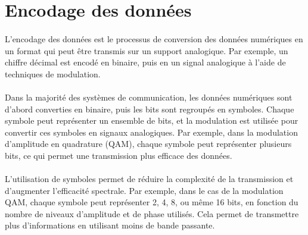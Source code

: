 \documentclass[a4paper,twocolumn]{report}
\begin{document}
\section{Encodage des données}

\paragraph{}L'encodage des données est le processus de conversion des données numériques
en un format qui peut être transmis sur un support analogique.
Par exemple, un chiffre décimal est encodé en binaire, puis en un signal
analogique à l'aide de techniques de modulation.
\paragraph{}Dans la majorité des systèmes de communication, les données numériques
sont d'abord converties en binaire, puis les bits sont regroupés en symboles.
Chaque symbole peut représenter un ensemble de bits, et la modulation est utilisée
pour convertir ces symboles en signaux analogiques.
Par exemple, dans la modulation d'amplitude en quadrature (QAM), chaque symbole
peut représenter plusieurs bits, ce qui permet une transmission plus efficace des données.
\paragraph{}L'utilisation de symboles permet de réduire la complexité de la transmission
et d'augmenter l'efficacité spectrale. Par exemple, dans le cas de la modulation QAM,
chaque symbole peut représenter 2, 4, 8, ou même 16 bits, en fonction du nombre de
niveaux d'amplitude et de phase utilisés. Cela permet de transmettre plus d'informations
en utilisant moins de bande passante.
\end{document}
